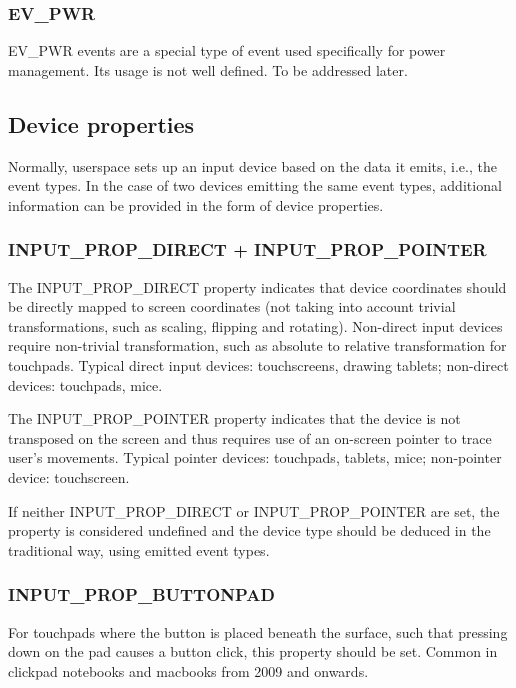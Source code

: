\documentclass[a4paper,8pt,english]{sphinxmanual}
\begin{document}
\subsubsection{EV\_PWR}
\label{input/event-codes:ev-pwr}
EV\_PWR events are a special type of event used specifically for power
management. Its usage is not well defined. To be addressed later.


\subsection{Device properties}
\label{input/event-codes:device-properties}
Normally, userspace sets up an input device based on the data it emits,
i.e., the event types. In the case of two devices emitting the same event
types, additional information can be provided in the form of device
properties.


\subsubsection{INPUT\_PROP\_DIRECT + INPUT\_PROP\_POINTER}
\label{input/event-codes:input-prop-direct-input-prop-pointer}
The INPUT\_PROP\_DIRECT property indicates that device coordinates should be
directly mapped to screen coordinates (not taking into account trivial
transformations, such as scaling, flipping and rotating). Non-direct input
devices require non-trivial transformation, such as absolute to relative
transformation for touchpads. Typical direct input devices: touchscreens,
drawing tablets; non-direct devices: touchpads, mice.

The INPUT\_PROP\_POINTER property indicates that the device is not transposed
on the screen and thus requires use of an on-screen pointer to trace user's
movements.  Typical pointer devices: touchpads, tablets, mice; non-pointer
device: touchscreen.

If neither INPUT\_PROP\_DIRECT or INPUT\_PROP\_POINTER are set, the property is
considered undefined and the device type should be deduced in the
traditional way, using emitted event types.


\subsubsection{INPUT\_PROP\_BUTTONPAD}
\label{input/event-codes:input-prop-buttonpad}
For touchpads where the button is placed beneath the surface, such that
pressing down on the pad causes a button click, this property should be
set. Common in clickpad notebooks and macbooks from 2009 and onwards.
\end{document}
